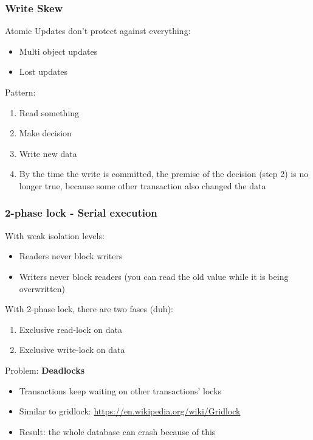 \documentclass{article}
\begin{document}
\subsubsection{Write Skew}

Atomic Updates don't protect against everything:

\begin{itemize}
    \item Multi object updates
    \item Lost updates
\end{itemize}

Pattern:

\begin{enumerate}
    \item Read something
    \item Make decision
    \item Write new data
    \item By the time the write is committed, the premise of the decision (step 2) is no longer true, because some other transaction also changed the data
\end{enumerate}

\subsubsection{2-phase lock - Serial execution}

With weak isolation levels:

\begin{itemize}
    \item Readers never block writers
    \item Writers never block readers (you can read the old value while it is being overwritten)
\end{itemize}

With 2-phase lock, there are two fases (duh):

\begin{enumerate}
    \item Exclusive read-lock on data
    \item Exclusive write-lock on data
\end{enumerate}

Problem: \textbf{Deadlocks}

\begin{itemize}
    \item Transactions keep waiting on other transactions' locks
    \item Similar to gridlock: \url{https://en.wikipedia.org/wiki/Gridlock}
    \item Result: the whole database can crash because of this
\end{itemize}
\end{document}
